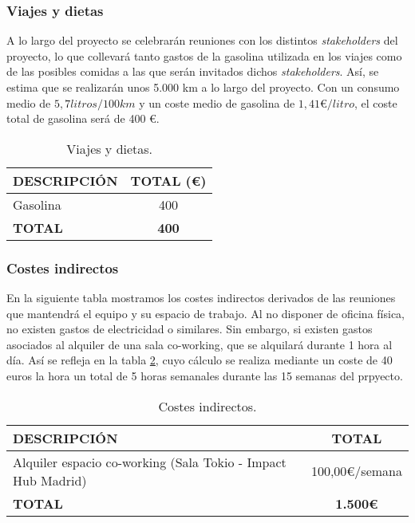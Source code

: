 \subsubsection{Viajes y dietas}
\par A lo largo del proyecto se celebrarán reuniones con los distintos \textit{stakeholders} del proyecto, lo que collevará tanto gastos de la gasolina utilizada en los viajes como de las posibles comidas a las que serán invitados dichos \textit{stakeholders}. Así, se estima que se realizarán unos 5.000 km a lo largo del proyecto. Con un consumo medio de $5,7 litros /100km$ y un coste medio de gasolina de $1,41 \euro/litro$, el coste total de gasolina será de 400 \euro.

\begin{table}[H]
\begin{center}
\begin{tabular}{l c}
\textbf{DESCRIPCIÓN} & \textbf{TOTAL (\euro)}\\ \hline \hline
Gasolina & 400\\
\textbf{TOTAL} & \textbf{400}\\ \hline
\end{tabular}
\caption{Viajes y dietas.}
\label{tab:viajes}
\end{center}
\end{table}


\subsubsection{Costes indirectos}
En la siguiente tabla mostramos los costes indirectos derivados de las reuniones que mantendrá el equipo y su espacio de trabajo. Al no disponer de oficina física, no existen gastos de electricidad o similares. Sin embargo, si existen gastos asociados al alquiler de una sala co-working, que se alquilará durante 1 hora al día. Así se refleja en la tabla \ref{tab:indirectos}, cuyo cálculo se realiza mediante un coste de 40 euros la hora un total de 5 horas semanales durante las 15 semanas del prpyecto.

\begin{table}[H]
\begin{center}
\begin{tabular}{l c}
\textbf{DESCRIPCIÓN} & \textbf{TOTAL}\\ \hline \hline
Alquiler espacio co-working (Sala Tokio - Impact Hub Madrid) & 100,00\euro/semana\\ \hline \hline
\textbf{TOTAL} & \textbf{1.500\euro}\\ \hline
\end{tabular}
\caption{Costes indirectos.}
\label{tab:indirectos}
\end{center}
\end{table}

